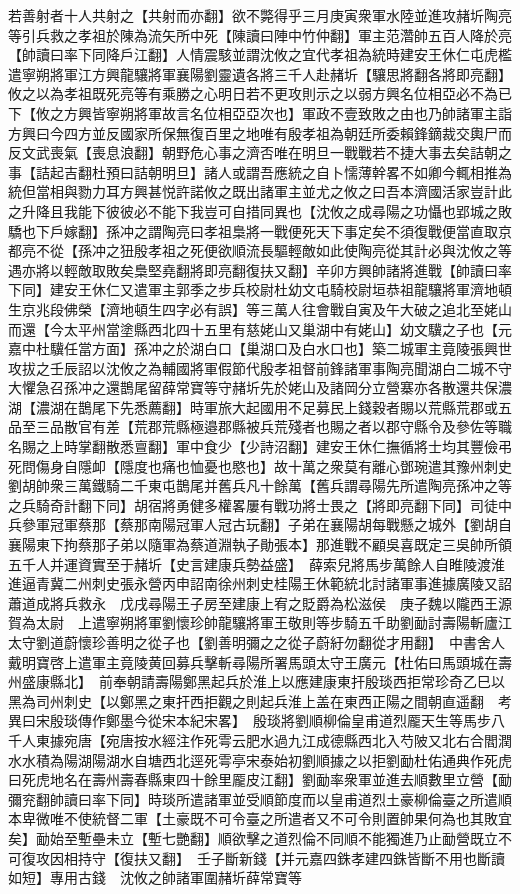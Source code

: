 若善射者十人共射之【共射而亦翻】欲不斃得乎三月庚寅衆軍水陸並進攻赭圻陶亮等引兵救之孝祖於陳為流矢所中死【陳讀曰陣中竹仲翻】軍主范濳帥五百人降於亮【帥讀曰率下同降戶江翻】人情震駭並謂沈攸之宜代孝祖為統時建安王休仁屯虎檻遣寧朔將軍江方興龍驤將軍襄陽劉靈遺各將三千人赴赭圻【驤思將翻各將即亮翻】攸之以為孝祖既死亮等有乘勝之心明日若不更攻則示之以弱方興名位相亞必不為已下【攸之方興皆寧朔將軍故言名位相亞亞次也】軍政不壹致敗之由也乃帥諸軍主詣方興曰今四方並反國家所保無復百里之地唯有殷孝祖為朝廷所委賴鋒鏑裁交輿尸而反文武喪氣【喪息浪翻】朝野危心事之濟否唯在明旦一戰戰若不捷大事去矣詰朝之事【詰起吉翻杜預曰詰朝明旦】諸人或謂吾應統之自卜懦薄幹畧不如卿今輒相推為統但當相與勠力耳方興甚悦許諾攸之既出諸軍主並尤之攸之曰吾本濟國活家豈計此之升降且我能下彼彼必不能下我豈可自措同異也【沈攸之成尋陽之功懾也郢城之敗驕也下戶嫁翻】孫冲之謂陶亮曰孝祖梟將一戰便死天下事定矣不須復戰便當直取京都亮不從【孫冲之狃殷孝祖之死便欲順流長驅輕敵如此使陶亮從其計必與沈攸之等遇亦將以輕敵取敗矣梟堅堯翻將即亮翻復扶又翻】辛卯方興帥諸將進戰【帥讀曰率下同】建安王休仁又遣軍主郭季之步兵校尉杜幼文屯騎校尉垣恭祖龍驤將軍濟地頓生京兆段佛榮【濟地頓生四字必有誤】等三萬人往會戰自寅及午大破之追北至姥山而還【今太平州當塗縣西北四十五里有慈姥山又巢湖中有姥山】幼文驥之子也【元嘉中杜驥任當方面】孫冲之於湖白口【巢湖口及白水口也】築二城軍主竟陵張興世攻拔之壬辰詔以沈攸之為輔國將軍假節代殷孝祖督前鋒諸軍事陶亮聞湖白二城不守大懼急召孫冲之還鵲尾留薛常寶等守赭圻先於姥山及諸岡分立營寨亦各散還共保濃湖【濃湖在鵲尾下先悉薦翻】時軍旅大起國用不足募民上錢穀者賜以荒縣荒郡或五品至三品散官有差【荒郡荒縣極邉郡縣被兵荒殘者也賜之者以郡守縣令及參佐等職名賜之上時掌翻散悉亶翻】軍中食少【少詩沼翻】建安王休仁撫循將士均其豐儉弔死問傷身自隱卹【隱度也痛也恤憂也愍也】故十萬之衆莫有離心鄧琬遣其豫州刺史劉胡帥衆三萬鐵騎二千東屯鵲尾并舊兵凡十餘萬【舊兵謂尋陽先所遣陶亮孫冲之等之兵騎奇計翻下同】胡宿將勇健多權畧屢有戰功將士畏之【將即亮翻下同】司徒中兵參軍冠軍蔡那【蔡那南陽冠軍人冠古玩翻】子弟在襄陽胡每戰懸之城外【劉胡自襄陽東下拘蔡那子弟以隨軍為蔡道淵執子勛張本】那進戰不顧吳喜既定三吳帥所領五千人并運資實至于赭圻【史言建康兵勢益盛】　薛索兒將馬步萬餘人自睢陵渡淮進逼青冀二州刺史張永營丙申詔南徐州刺史桂陽王休範統北討諸軍事進據廣陵又詔蕭道成將兵救永　戊戌尋陽王子房至建康上宥之貶爵為松滋侯　庚子魏以隴西王源賀為太尉　上遣寧朔將軍劉懷珍帥龍驤將軍王敬則等步騎五千助劉勔討壽陽斬廬江太守劉道蔚懷珍善明之從子也【劉善明彌之之從子蔚紆勿翻從才用翻】　中書舍人戴明寶啓上遣軍主竟陵黄回募兵擊斬尋陽所署馬頭太守王廣元【杜佑曰馬頭城在壽州盛康縣北】　前奉朝請壽陽鄭黑起兵於淮上以應建康東扞殷琰西拒常珍奇乙巳以黑為司州刺史【以鄭黑之東扞西拒觀之則起兵淮上盖在東西正陽之間朝直遥翻　考異曰宋殷琰傳作鄭墨今從宋本紀宋畧】　殷琰將劉順柳倫皇甫道烈龎天生等馬步八千人東據宛唐【宛唐按水經注作死雩云肥水過九江成德縣西北入芍陂又北右合閻潤水水積為陽湖陽湖水自塘西北逕死雩亭宋泰始初劉順據之以拒劉勔杜佑通典作死虎曰死虎地名在壽州壽春縣東四十餘里龎皮江翻】劉勔率衆軍並進去順數里立營【勔彌兖翻帥讀曰率下同】時琰所遣諸軍並受順節度而以皇甫道烈土豪柳倫臺之所遣順本卑微唯不使統督二軍【土豪既不可令臺之所遣者又不可令則置帥果何為也其敗宜矣】勔始至塹壘未立【塹七艷翻】順欲擊之道烈倫不同順不能獨進乃止勔營既立不可復攻因相持守【復扶又翻】　壬子斷新錢【并元嘉四銖孝建四銖皆斷不用也斷讀如短】專用古錢　沈攸之帥諸軍圍赭圻薛常寶等